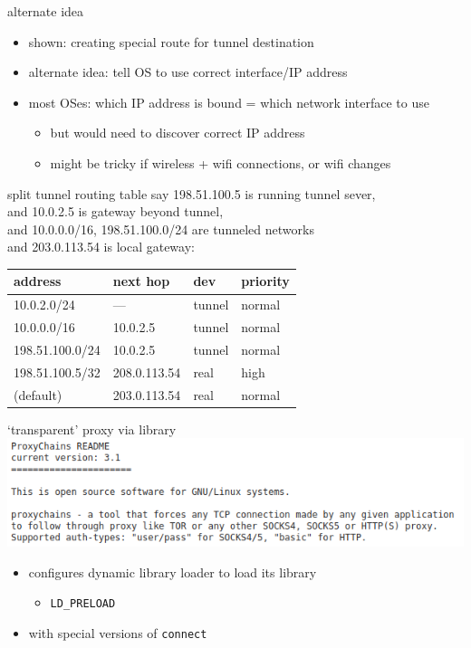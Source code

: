 \begin{frame}{alternate idea}
    \begin{itemize}
    \item shown: creating special route for tunnel destination
    \item alternate idea: tell OS to use correct interface/IP address
    \item most OSes: which IP address is bound = which network interface to use
        \begin{itemize}
        \item but would need to discover correct IP address
        \item might be tricky if wireless + wifi connections, or wifi changes
        \end{itemize}
    \end{itemize}
\end{frame}


\begin{frame}[fragile]{split tunnel routing table}
say 198.51.100.5 is running tunnel sever, \\
and 10.0.2.5  is gateway beyond tunnel, \\
and 10.0.0.0/16, 198.51.100.0/24 are tunneled networks \\
and 203.0.113.54 is local gateway: \\
\begin{tabular}{l|l|l|l}
address & next hop & dev & priority\\ \hline
10.0.2.0/24 & --- & tunnel & normal \\
10.0.0.0/16 & 10.0.2.5& tunnel & normal \\
198.51.100.0/24 & 10.0.2.5& tunnel & normal \\
198.51.100.5/32 & 208.0.113.54 & real & high\\
(default) & 203.0.113.54 & real & normal \\
\end{tabular}
\end{frame}


\begin{frame}[fragile]{`transparent' proxy via library}
\includegraphics[width=\textwidth]{../encap/proxy-chains}
\begin{itemize}
\item configures dynamic library loader to load its library
    \begin{itemize}
    \item \texttt{LD\_PRELOAD}
    \end{itemize}
\item with special versions of \texttt{connect}
\end{itemize}
\end{frame}

